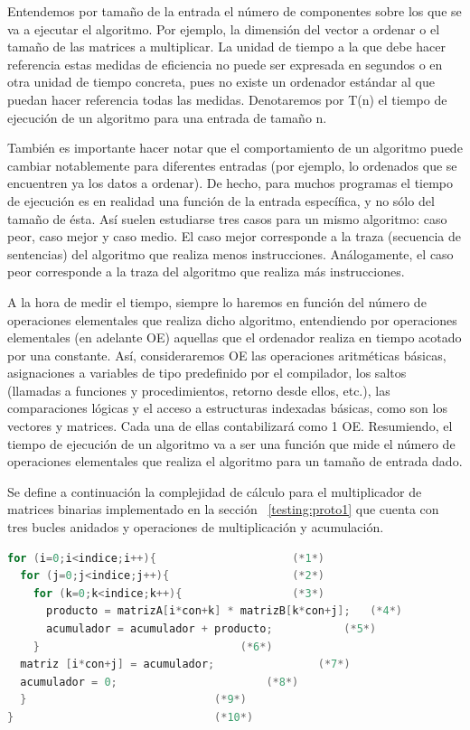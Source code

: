 		Entendemos por tamaño de la entrada el número de componentes sobre los que  se va a ejecutar el algoritmo. Por ejemplo, la dimensión del vector a
		ordenar o el tamaño de las matrices a multiplicar. La unidad de tiempo a la que debe hacer referencia estas medidas de eficiencia  no puede ser
		expresada en segundos o en otra unidad de tiempo concreta, pues no existe un ordenador estándar al que puedan hacer referencia todas las medidas. 
        Denotaremos por T(n) el tiempo de ejecución de un algoritmo para una entrada de tamaño n. 
        
        También es importante hacer notar que el comportamiento de un algoritmo puede cambiar notablemente para diferentes entradas (por ejemplo, lo
        ordenados que se encuentren ya los datos a ordenar). De hecho, para muchos programas el tiempo de ejecución es en realidad una función de la
        entrada específica, y no sólo del tamaño de ésta. Así suelen estudiarse tres casos para un mismo algoritmo: caso peor, caso mejor y caso
        medio. El caso mejor corresponde a la traza (secuencia de sentencias) del algoritmo que realiza menos instrucciones. Análogamente, el caso
        peor corresponde a la traza del algoritmo que realiza más instrucciones.
 		
 		A la hora de medir el tiempo, siempre lo haremos en función del número de operaciones elementales que realiza dicho algoritmo, entendiendo por
 		operaciones elementales (en adelante OE) aquellas que el ordenador realiza en tiempo acotado por una constante. Así, consideraremos OE las
 		operaciones aritméticas básicas,  asignaciones a variables de tipo predefinido por el compilador, los saltos (llamadas a funciones y
 		procedimientos, retorno desde ellos, etc.), las comparaciones lógicas y el acceso a estructuras indexadas básicas, como son los vectores y
 		matrices. Cada una de ellas contabilizará como 1 OE. Resumiendo, el tiempo de ejecución de un algoritmo va a ser una función que mide el número de
 		operaciones elementales que realiza el algoritmo para un tamaño de entrada dado.
		
		Se define a continuación la complejidad de cálculo para el multiplicador de matrices binarias implementado en la sección ~\ref {testing:proto1} que
		cuenta con tres bucles anidados y operaciones de multiplicación y acumulación.
	
			
	\begin{lstlisting}[language=C,frame=single]
for (i=0;i<indice;i++){						(*1*)
  for (j=0;j<indice;j++){					(*2*)
    for (k=0;k<indice;k++){					(*3*)
	  producto = matrizA[i*con+k] * matrizB[k*con+j];	(*4*)
	  acumulador = acumulador + producto;			(*5*) 
    }								(*6*)
  matriz [i*con+j] = acumulador;				(*7*)
  acumulador = 0;						(*8*)
  }								(*9*)
}								(*10*)
	\end{lstlisting}
		
